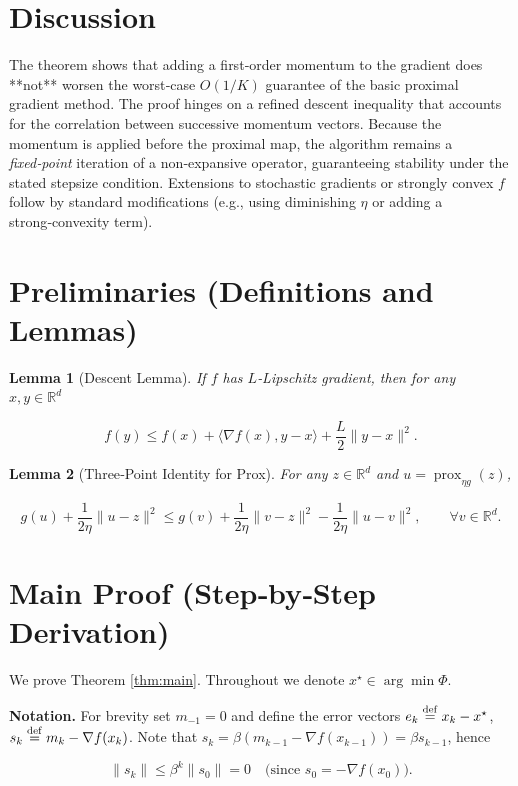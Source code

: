 \documentclass{article}
\newtheorem{lemma}{Lemma}
\begin{document}
\section*{Discussion}
The theorem shows that adding a first‑order momentum to the gradient does **not** worsen the worst‑case $O(1/K)$ guarantee of the basic proximal gradient method.  The proof hinges on a refined descent inequality that accounts for the correlation between successive momentum vectors.  Because the momentum is applied before the proximal map, the algorithm remains a \emph{fixed‑point} iteration of a non‑expansive operator, guaranteeing stability under the stated stepsize condition.  Extensions to stochastic gradients or strongly convex $f$ follow by standard modifications (e.g., using diminishing $\eta$ or adding a strong‑convexity term).

\section*{Preliminaries (Definitions and Lemmas)}
\begin{lemma}[Descent Lemma]\label{lem:descent}
If $f$ has $L$‑Lipschitz gradient, then for any $x,y\in\mathbb{R}^d$  

\[
f(y)\le f(x)+\langle\nabla f(x),y-x\rangle+\frac{L}{2}\|y-x\|^2 .
\]
\end{lemma}

\begin{lemma}[Three‑Point Identity for Prox]\label{lem:prox}
For any $z\in\mathbb{R}^d$ and $u=\operatorname{prox}_{\eta g}(z)$,  

\[
g(u)+\frac{1}{2\eta}\|u-z\|^2\le g(v)+\frac{1}{2\eta}\|v-z\|^2-\frac{1}{2\eta}\|u-v\|^2,
\qquad\forall v\in\mathbb{R}^d .
\]
\end{lemma}

\section*{Main Proof (Step‑by‑Step Derivation)}
We prove Theorem \ref{thm:main}.  Throughout we denote $x^\star\in\arg\min\Phi$.

\bigskip
\noindent\textbf{Notation.} For brevity set $m_{-1}=0$ and define the error vectors  
$e_k\stackrel{\rm def}{=}x_k-x^\star$, $s_k\stackrel{\rm def}{=}m_k-\nabla f(x_k)$.  
Note that $s_k=\beta(m_{k-1}-\nabla f(x_{k-1}))=\beta s_{k-1}$, hence  

\[
\|s_k\|\le\beta^{k}\|s_0\|=0\quad\text{(since }s_0=-\nabla f(x_0)).
\tag{1}
\]
\end{document}
